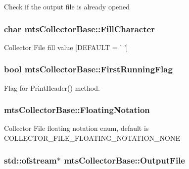 Check if the output file is already opened \hypertarget{classmts_collector_base_a7d28e7a5dc2c367f963a53f9b786776d}{
\subsubsection[{Fill\-Character}]{\setlength{\rightskip}{0pt plus 5cm}char mts\-Collector\-Base\-::\-Fill\-Character\hspace{0.3cm}{\ttfamily [protected]}}}\label{classmts_collector_base_a7d28e7a5dc2c367f963a53f9b786776d}
Collector File fill value \mbox{[}D\-E\-F\-A\-U\-L\-T = ' '\mbox{]} \hypertarget{classmts_collector_base_abed8163d5f91e30ac10344e82c405cd7}{
\subsubsection[{First\-Running\-Flag}]{\setlength{\rightskip}{0pt plus 5cm}bool mts\-Collector\-Base\-::\-First\-Running\-Flag\hspace{0.3cm}{\ttfamily [protected]}}}\label{classmts_collector_base_abed8163d5f91e30ac10344e82c405cd7}
Flag for Print\-Header() method. \hypertarget{classmts_collector_base_a1f80a8a534930afcbeade8a12f7d63e3}{
\subsubsection[{Floating\-Notation}]{ mts\-Collector\-Base\-::\-Floating\-Notation\hspace{0.3cm}{\ttfamily [protected]}}}\label{classmts_collector_base_a1f80a8a534930afcbeade8a12f7d63e3}
Collector File floating notation enum, default is C\-O\-L\-L\-E\-C\-T\-O\-R\-\_\-\-F\-I\-L\-E\-\_\-\-F\-L\-O\-A\-T\-I\-N\-G\-\_\-\-N\-O\-T\-A\-T\-I\-O\-N\-\_\-\-N\-O\-N\-E \hypertarget{classmts_collector_base_a7072747db6ae6fb544364d8fe11f741d}{
\subsubsection[{Output\-File}]{\setlength{\rightskip}{0pt plus 5cm}std\-::ofstream$\ast$ mts\-Collector\-Base\-::\-Output\-File\hspace{0.3cm}{\ttfamily [protected]}}}\label{classmts_collector_base_a7072747db6ae6fb544364d8fe11f741d}
